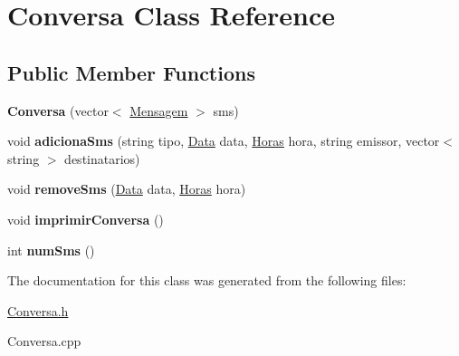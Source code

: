 \hypertarget{class_conversa}{}\section{Conversa Class Reference}
\label{class_conversa}
\subsection*{Public Member Functions}
\begin{DoxyCompactItemize}
\item 
\hypertarget{class_conversa_a7f3871352a73f5c4a2c83b0ac0f2bf7b}{}{\bfseries Conversa} (vector$<$ \hyperlink{class_mensagem}{Mensagem} $>$ sms)\label{class_conversa_a7f3871352a73f5c4a2c83b0ac0f2bf7b}

\item 
\hypertarget{class_conversa_a3fcfd519877340aa3602f00dac1738d6}{}void {\bfseries adiciona\+Sms} (string tipo, \hyperlink{class_data}{Data} data, \hyperlink{class_horas}{Horas} hora, string emissor, vector$<$ string $>$ destinatarios)\label{class_conversa_a3fcfd519877340aa3602f00dac1738d6}

\item 
\hypertarget{class_conversa_a4668868dda811bce5e8da4b82e1047d8}{}void {\bfseries remove\+Sms} (\hyperlink{class_data}{Data} data, \hyperlink{class_horas}{Horas} hora)\label{class_conversa_a4668868dda811bce5e8da4b82e1047d8}

\item 
\hypertarget{class_conversa_a9bb99c60f68841f6a7a01c1c68db15df}{}void {\bfseries imprimir\+Conversa} ()\label{class_conversa_a9bb99c60f68841f6a7a01c1c68db15df}

\item 
\hypertarget{class_conversa_a5738b11d39a41e1373f2502ddadcd3fb}{}int {\bfseries num\+Sms} ()\label{class_conversa_a5738b11d39a41e1373f2502ddadcd3fb}

\end{DoxyCompactItemize}


The documentation for this class was generated from the following files\+:\begin{DoxyCompactItemize}
\item 
\hyperlink{_conversa_8h}{Conversa.\+h}\item 
Conversa.\+cpp\end{DoxyCompactItemize}
